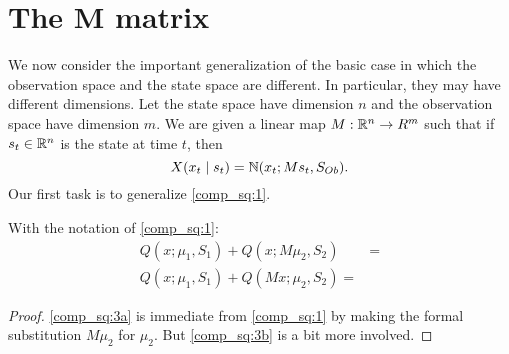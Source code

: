 \documentclass[12pt,leqno]{article}
\begin{document}
\section{The M matrix}
We now consider the important generalization of the basic case in which the observation space and the state space are different.
In particular, they may have different dimensions.  Let the state space have dimension $n$ and the observation space have
dimension $m$.  We are given a linear map $M: {\mathbb R}^n\rightarrow R^m$ such that if $s_t\in {\mathbb R}^n$ is the state at time $t$, then
$$
X(x_t\mid s_t)= {\mathbb N}(x_t;Ms_t,S_{Ob}).
$$
Our first task is to generalize \eqref{comp_sq:1}.

\begin{Lem}\label{comp_sq:3}
With the notation of \eqref{comp_sq:1}:
\begin{align}
  Q(x;\mu_1,S_1) + Q(x;M\mu_2,S_2) &= \label{comp_sq:3a}\\
  Q(x;\mu_1,S_1) + Q(Mx;\mu_2,S_2) = \label{comp_sq:3b}
\end{align}
\end{Lem}
\begin{proof}
\eqref{comp_sq:3a} is immediate from \eqref{comp_sq:1} by making the formal substitution $M\mu_2$ for $\mu_2$.  But \eqref{comp_sq:3b} is a bit more involved.  

\end{proof}
\end{document}

